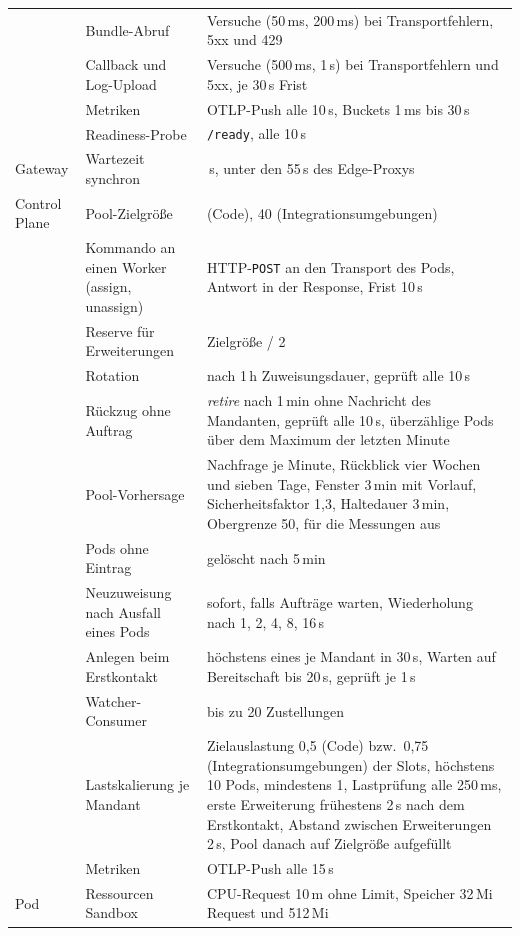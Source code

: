 \begin{table}[H]
\begin{tabularx}{\textwidth}{@{}>{\RaggedRight\arraybackslash}p{}
    >{\RaggedRight\arraybackslash}p{} >{\RaggedRight\arraybackslash}X@{}}
    & Bundle-Abruf & 3 Versuche (50\,ms, 200\,ms) bei Transportfehlern, 5xx und 429 \\
    & Callback und Log-Upload & 3 Versuche (500\,ms, 1\,s) bei Transportfehlern und 5xx, je 30\,s Frist \\
    & Metriken & \ac{OTLP}-Push alle 10\,s, Buckets 1\,ms bis 30\,s \\
    & Readiness-Probe & \texttt{/ready}, alle 10\,s \\[2pt]
    Gateway & Wartezeit synchron & 53\,s, unter den 55\,s des Edge-Proxys \\[2pt]
        Control Plane & Pool-Zielgröße & 3 (Code), 40 (Integrationsumgebungen) \\
    & Kommando an einen Worker (assign, unassign) & \ac{HTTP}-\texttt{POST} an den Transport des
      Pods, Antwort in der Response, Frist 10\,s \\
    & Reserve für Erweiterungen & Zielgröße / 2 \\
    & Rotation & nach 1\,h Zuweisungsdauer, geprüft alle 10\,s \\
    & Rückzug ohne Auftrag & \emph{retire} nach 1\,min ohne Nachricht des Mandanten, geprüft alle 10\,s,
      überzählige Pods über dem Maximum der letzten Minute \\
    & Pool-Vorhersage & Nachfrage je Minute, Rückblick vier Wochen und sieben Tage, Fenster 3\,min mit
      Vorlauf, Sicherheitsfaktor 1,3, Haltedauer 3\,min, Obergrenze 50, für die Messungen aus \\
    & Pods ohne Eintrag & gelöscht nach 5\,min \\
    & Neuzuweisung nach Ausfall eines Pods & sofort, falls Aufträge warten, Wiederholung nach 1, 2, 4, 8,
      16\,s \\
    & Anlegen beim Erstkontakt & höchstens eines je Mandant in 30\,s, Warten auf Bereitschaft
      bis 20\,s, geprüft je 1\,s \\
    & Watcher-Consumer & bis zu 20 Zustellungen \\
    & Lastskalierung je Mandant & Zielauslastung 0,5 (Code) bzw.\ 0,75 (Integrationsumgebungen)
      der Slots, höchstens 10 Pods, mindestens
      1, Lastprüfung alle 250\,ms, erste Erweiterung frühestens 2\,s nach dem Erstkontakt, Abstand
      zwischen Erweiterungen 2\,s, Pool danach auf Zielgröße aufgefüllt \\
    & Metriken & \ac{OTLP}-Push alle 15\,s \\[2pt]
    Pod & Ressourcen Sandbox & \ac{CPU}-Request 10\,m ohne Limit, Speicher 32\,Mi Request und 512\,Mi

\end{tabularx}
\end{table}
